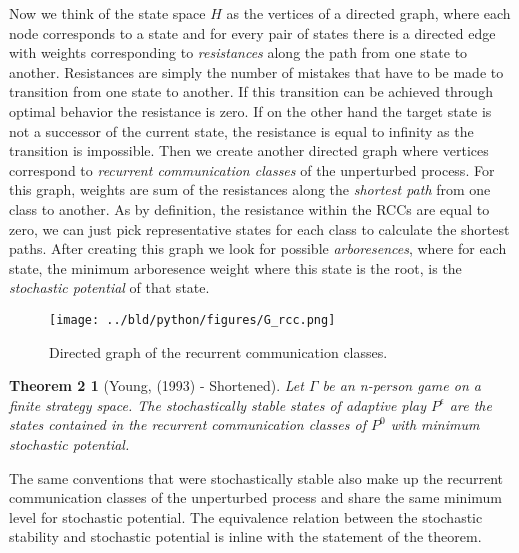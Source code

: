\documentclass[11pt, a4paper, leqno]{article}
\begin{document}
Now we think of the state space $H$ as the vertices of a directed graph, where each node
corresponds to a state and for every pair of states there is a directed edge with weights
corresponding to \textit{resistances} along the path from one state to another. Resistances
are simply the number of mistakes that have to be made to transition from one state to another.
If this transition can be achieved through optimal behavior the resistance is zero.
If on the other hand the target state is not a successor of the current state, the resistance is
equal to infinity as the transition is impossible. Then we create another directed
graph where vertices correspond to \textit{recurrent communication classes} of the unperturbed process.
For this graph, weights are sum of the resistances along the \textit{shortest path} from one class to another.
As by definition, the resistance within the RCCs are equal to zero, we can just pick representative states for
each class to calculate the shortest paths. After creating this graph we look for possible \textit{arboresences},
where for each state, the minimum arboresence weight where this state is the root,
is the \textit{stochastic potential} of that state.

\begin{figure}[H]

    \centering
    \texttt{[image: ../bld/python/figures/G\_rcc.png]}

    \caption{Directed graph of the recurrent communication classes.}

    \label{fig:python-grcc}

\end{figure}

\newtheorem*{theorem}{Theorem 2}
\begin{theorem}[Young, (1993) - Shortened]
    Let $\Gamma$ be an n-person game on a finite strategy space. The stochastically stable
    states of adaptive play $P^{\epsilon}$ are the states contained in the recurrent communication
    classes of $P^{0}$ with minimum stochastic potential.
    \end{theorem}

The same conventions that were stochastically stable also make up the recurrent communication classes of the unperturbed
process and share the same minimum level for stochastic potential. The equivalence relation between the stochastic stability
and stochastic potential is inline with the statement of the theorem.
\end{document}
